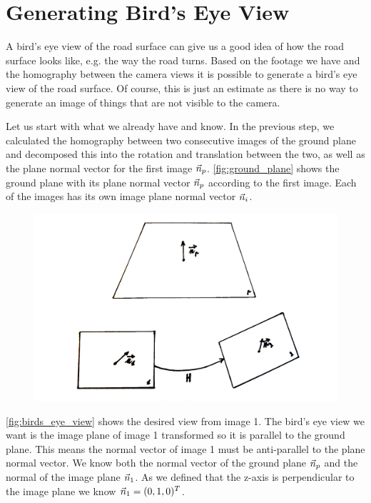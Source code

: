\section{Generating Bird's Eye View}
A bird's eye view of the road surface can give us a good idea of how the road surface looks like, e.g. the way the road turns. Based on the footage we have and the homography between the camera views it is possible to generate a bird's eye view of the road surface. Of course, this is just an estimate as there is no way to generate an image of things that are not visible to the camera.\bigskip

Let us start with what we already have and know. In the previous step, we calculated the homography between two consecutive images of the ground plane and decomposed this into the rotation and translation between the two, as well as the plane normal vector for the first image $\vec n_p$. \autoref{fig:ground_plane} shows the ground plane with its plane normal vector $\vec n_p$ according to the first image. Each of the images has its own image plane normal vector $\vec n_i$.\bigskip

\begin{figure}
    \centering
    \includegraphics[width=\textwidth]{figures/birds_eye_view.jpg}
    \caption{}
    \label{fig:ground_plane}
\end{figure}

\autoref{fig:birds_eye_view} shows the desired view from image 1. The bird's eye view we want is the image plane of image 1 transformed so it is parallel to the ground plane. This means the normal vector of image 1 must be anti-parallel to the plane normal vector. We know both the normal vector of the ground plane $\vec n_p$ and the normal of the image plane $\vec n_1$. As we defined that the z-axis is perpendicular to the image plane we know $\vec n_1 = (0, 1, 0)^T$.\bigskip

